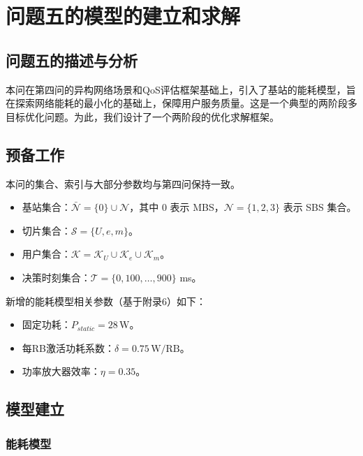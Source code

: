 \section{问题五的模型的建立和求解}
\subsection{问题五的描述与分析}

本问在第四问的异构网络场景和QoS评估框架基础上，引入了基站的能耗模型，旨在探索网络能耗的最小化的基础上，保障用户服务质量。这是一个典型的两阶段多目标优化问题。为此，我们设计了一个两阶段的优化求解框架。

\subsection{预备工作}
本问的集合、索引与大部分参数均与第四问保持一致。
\begin{itemize}
    \item 基站集合：$\bar{\mathcal{N}}=\{0\}\cup\mathcal{N}$，其中 $0$ 表示 MBS，$\mathcal{N}=\{1,2,3\}$ 表示 SBS 集合。
    \item 切片集合：$\mathcal{S}=\{U,e,m\}$。
    \item 用户集合：$\mathcal{K}=\mathcal{K}_U\cup\mathcal{K}_e\cup\mathcal{K}_m$。
    \item 决策时刻集合：$\mathcal{T}=\{0,100,\dots,900\}$ ms。
\end{itemize}

新增的能耗模型相关参数（基于附录6）如下：
\begin{itemize}
    \item 固定功耗：$P_{static} = 28\,\mathrm{W}$。
    \item 每RB激活功耗系数：$\delta = 0.75\,\mathrm{W/RB}$。
    \item 功率放大器效率：$\eta = 0.35$。
\end{itemize}

\subsection{模型建立}

\subsubsection{能耗模型}

